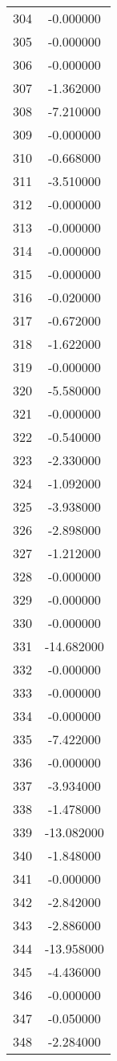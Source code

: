 \documentclass[12pt]{article}
\begin{document}
\begin{longtable}{@{}cc@{}}
304 & -0.000000 \\
305 & -0.000000 \\
306 & -0.000000 \\
307 & -1.362000 \\
308 & -7.210000 \\
309 & -0.000000 \\
310 & -0.668000 \\
311 & -3.510000 \\
312 & -0.000000 \\
313 & -0.000000 \\
314 & -0.000000 \\
315 & -0.000000 \\
316 & -0.020000 \\
317 & -0.672000 \\
318 & -1.622000 \\
319 & -0.000000 \\
320 & -5.580000 \\
321 & -0.000000 \\
322 & -0.540000 \\
323 & -2.330000 \\
324 & -1.092000 \\
325 & -3.938000 \\
326 & -2.898000 \\
327 & -1.212000 \\
328 & -0.000000 \\
329 & -0.000000 \\
330 & -0.000000 \\
331 & -14.682000 \\
332 & -0.000000 \\
333 & -0.000000 \\
334 & -0.000000 \\
335 & -7.422000 \\
336 & -0.000000 \\
337 & -3.934000 \\
338 & -1.478000 \\
339 & -13.082000 \\
340 & -1.848000 \\
341 & -0.000000 \\
342 & -2.842000 \\
343 & -2.886000 \\
344 & -13.958000 \\
345 & -4.436000 \\
346 & -0.000000 \\
347 & -0.050000 \\
348 & -2.284000 \\

\end{longtable}
\end{document}
